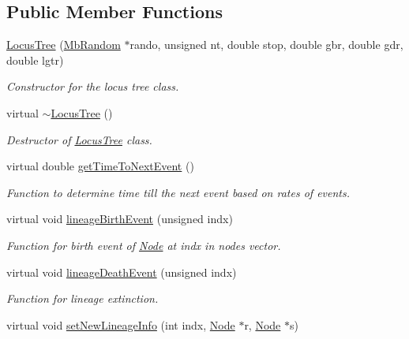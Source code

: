 \subsection*{Public Member Functions}
\begin{DoxyCompactItemize}
\item 
\mbox{\hyperlink{class_locus_tree_a42f3e86f07cf22caab268d6ffb79ce83}{Locus\+Tree}} (\mbox{\hyperlink{class_mb_random}{Mb\+Random}} $\ast$rando, unsigned nt, double stop, double gbr, double gdr, double lgtr)
\begin{DoxyCompactList}\small\item\em Constructor for the locus tree class. \end{DoxyCompactList}\item 
\mbox{\label{class_locus_tree_a8b1037605f0f12240aa8b284b98db883}} 
virtual \mbox{\hyperlink{class_locus_tree_a8b1037605f0f12240aa8b284b98db883}{$\sim$\+Locus\+Tree}} ()
\begin{DoxyCompactList}\small\item\em Destructor of \mbox{\hyperlink{class_locus_tree}{Locus\+Tree}} class. \end{DoxyCompactList}\item 
virtual double \mbox{\hyperlink{class_locus_tree_aadc6be0b7998a9af9c815693b17bbd75}{get\+Time\+To\+Next\+Event}} ()
\begin{DoxyCompactList}\small\item\em Function to determine time till the next event based on rates of events. \end{DoxyCompactList}\item 
virtual void \mbox{\hyperlink{class_locus_tree_a7753da5011b9c38cf2c6cdcebfd4e2a7}{lineage\+Birth\+Event}} (unsigned indx)
\begin{DoxyCompactList}\small\item\em Function for birth event of \mbox{\hyperlink{class_node}{Node}} at indx in nodes vector. \end{DoxyCompactList}\item 
virtual void \mbox{\hyperlink{class_locus_tree_a8016a380d942ecb255e6bfe36275f398}{lineage\+Death\+Event}} (unsigned indx)
\begin{DoxyCompactList}\small\item\em Function for lineage extinction. \end{DoxyCompactList}\item 
virtual void \mbox{\hyperlink{class_locus_tree_a37103788986521133f5b828b00cb7221}{set\+New\+Lineage\+Info}} (int indx, \mbox{\hyperlink{class_node}{Node}} $\ast$r, \mbox{\hyperlink{class_node}{Node}} $\ast$s)

\end{DoxyCompactItemize}
